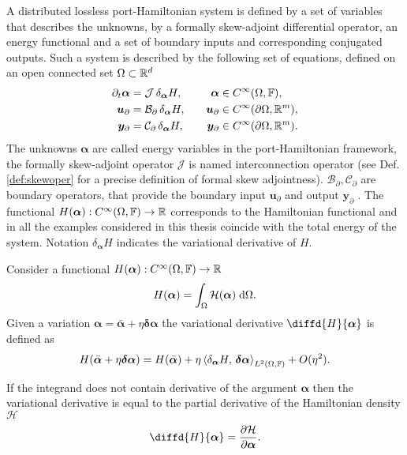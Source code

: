A distributed lossless port-Hamiltonian system is defined by a set of variables that describes the unknowns, by a formally skew-adjoint differential operator, an energy functional and a set of boundary inputs and corresponding conjugated outputs. Such a system is described by the following set of equations, defined on an open connected set $\Omega \subset \bbR^d$
\begin{equation}\label{eq:phsys}
\begin{aligned}
\partial_t {\bm{\alpha}} &= \mathcal{J} \, \delta_{\bm{\alpha}}{H}, \\
\bm{u}_\partial &= \mathcal{B}_\partial  \, \delta_{\bm{\alpha}}{H}, \\
\bm{y}_\partial &= \mathcal{C}_\partial \, \delta_{\bm{\alpha}}{H}, 
\end{aligned} \qquad
\begin{aligned}
{\bm{\alpha}} &\in C^\infty(\Omega, \bbF),\\
\bm{u}_\partial &\in C^\infty(\partial\Omega,\bbR^m), \\
\bm{y}_\partial &\in C^\infty(\partial\Omega,\bbR^m). 
\end{aligned}
\end{equation}
The unknowns $\bm{\alpha}$ are called energy variables in the port-Hamiltonian framework, the formally skew-adjoint operator $\mathcal{J}$ is named interconnection operator (see Def. \ref{def:skewoper} for a precise definition of formal skew adjointness). $\mathcal{B}_\partial, \mathcal{C}_\partial$ are boundary operators, that provide the boundary input $\bm{u}_\partial$ and output $\bm{y}_\partial$ \cite[Chapter 4]{tucsnak2009observation}. The functional $H(\bm{\alpha}): C^\infty(\Omega, \bbF) \rightarrow \bbR$ corresponds to the Hamiltonian functional and in all the examples considered in this thesis coincide with the total energy of the system. Notation $\delta_{\bm{\alpha}}{H}$ indicates the variational derivative of $H$.

\begin{definition}
Consider a functional $H(\bm{\alpha}): C^\infty(\Omega, \bbF) \rightarrow \bbR$
\begin{equation*} 
H(\bm{\alpha}) = \int_{\Omega} \mathcal{H}(\bm{\alpha}) \d{\Omega}.
\end{equation*}
Given a variation $\bm{\alpha} = \bar{\bm{\alpha}} + \eta \bm{\delta\alpha}$ the variational derivative $\diffd{H}{\bm{\alpha}}$ is defined as
\begin{equation*}
H(\bar{\bm{\alpha}} + \eta \bm{\delta\alpha}) = H(\bar{\bm{\alpha}}) + \eta \inner[L^2(\Omega, \bbF)]{\delta_{\bm{\alpha}}{H}}{\bm{\delta\alpha}} + O(\eta^2).
\end{equation*}
\end{definition}
\begin{remark}
If the integrand does not contain derivative of the argument $\bm{\alpha}$ then the variational derivative is equal to the partial derivative of the Hamiltonian density $\mathcal{H}$
\begin{equation*}
\diffd{H}{\bm{\alpha}} = \diffp{\mathcal{H}}{\bm{\alpha}}.
\end{equation*}
\end{remark}

